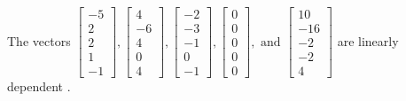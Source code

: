 \begin{exercise}
\begin{exerciseStatement}
  \end{exerciseStatement}
  \begin{exerciseAnswer}
   The vectors \(\left[\begin{array}{r}
-5 \\
2 \\
2 \\
1 \\
-1
\end{array}\right] , \left[\begin{array}{r}
4 \\
-6 \\
4 \\
0 \\
4
\end{array}\right] , \left[\begin{array}{r}
-2 \\
-3 \\
-1 \\
0 \\
-1
\end{array}\right] , \left[\begin{array}{r}
0 \\
0 \\
0 \\
0 \\
0
\end{array}\right] , \text{ and } \left[\begin{array}{r}
10 \\
-16 \\
-2 \\
-2 \\
4
\end{array}\right]\) are 
  	 linearly dependent  .
  


  \end{exerciseAnswer}
\end{exercise}